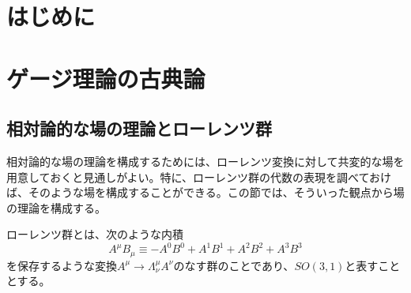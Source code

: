 \documentclass[unicode,a4paper,10pt]{ltjsarticle}
\begin{document}
\maketitle
\tableofcontents

\clearpage
\section{はじめに}



\clearpage
\section{ゲージ理論の古典論}

\subsection{相対論的な場の理論とローレンツ群}

相対論的な場の理論を構成するためには、ローレンツ変換に対して共変的な場を用意しておくと見通しがよい。特に、ローレンツ群の代数の表現を調べておけば、そのような場を構成することができる。この節では、そういった観点から場の理論を構成する。

ローレンツ群とは、次のような内積
\begin{equation}
  A^{\mu}B_{\mu}
  \equiv
  -
  A^{0}B^{0}
  +
  A^{1}B^{1}
  +
  A^{2}B^{2}
  +
  A^{3}B^{3}
\end{equation}
を保存するような変換$A^{\mu}\rightarrow\Lambda^{\mu}_{\nu}A^{\nu}$のなす群のことであり、$SO(3,1)$と表すこととする。











\clearpage



\nocite{Peskin:1995}
\nocite{Sato:2016}
\nocite{Mogi:2001}

\end{document}
